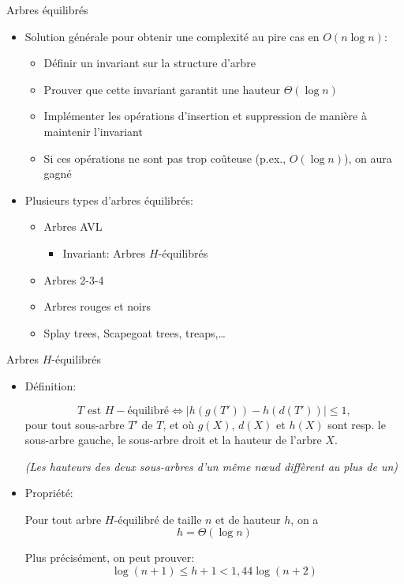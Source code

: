 \begin{frame}{Arbres équilibrés}
\begin{itemize}
\item Solution générale pour obtenir une complexité au pire cas en $O(n\log n)$:%
\begin{itemize}
\item Définir un \alert{invariant} sur la structure d'arbre
\item Prouver que cette invariant garantit une hauteur $\Theta(\log n)$
\item Implémenter les opérations d'insertion et suppression de manière à maintenir l'invariant
\item Si ces opérations ne sont pas trop coûteuse (p.ex., $O(\log
  n)$), on aura gagné
\end{itemize}

\bigskip

\item Plusieurs types d'arbres équilibrés:
\begin{itemize}
\item Arbres AVL
\begin{itemize}
\item Invariant: Arbres $H$-équilibrés
\end{itemize}
\item Arbres 2-3-4
\item Arbres rouges et noirs
\item Splay trees, Scapegoat trees, treaps,\ldots
\end{itemize}
\end{itemize}
\end{frame}

\begin{frame}{Arbres $H$-équilibrés}
\begin{itemize}
\item \alert{Définition:}

$$T\mbox{ est }H-\mbox{équilibré}\Leftrightarrow |h(g(T'))-h(d(T'))|\leq 1,$$
pour tout sous-arbre $T'$ de $T$, et où $g(X)$, $d(X)$ et $h(X)$ sont resp. le sous-arbre gauche, le sous-arbre droit et la hauteur de l'arbre $X$.

\medskip

\emph{(Les hauteurs des deux sous-arbres d'un même n\oe ud diffèrent au plus de un)}

\bigskip

\item \alert{Propriété:}

Pour tout arbre $H$-équilibré de taille $n$ et de hauteur $h$, on a 
$$h=\Theta(\log n)$$

Plus précisément, on peut prouver:
 $$\log(n+1)\leq h+1< 1,44 \log(n+2)$$
\end{itemize}

\end{frame}


